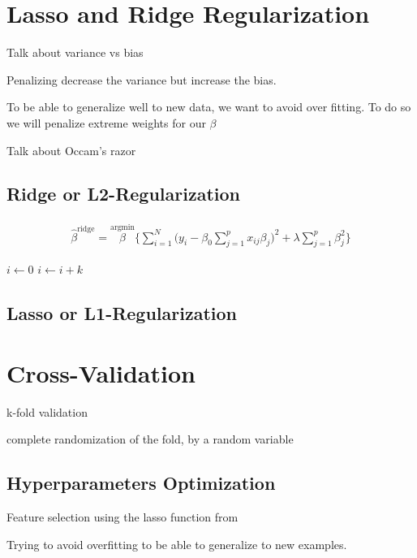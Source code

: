 \documentclass[conference]{IEEEtran}
\begin{document}
\section{Lasso and Ridge Regularization}

Talk about variance vs bias

Penalizing decrease the variance but increase the bias.

To be able to generalize well to new data, we want to avoid over fitting. To do
so we will penalize extreme weights for our $\beta$

Talk about Occam's razor

\subsection{Ridge or L2-Regularization}

\begin{eqnarray}
  \hat{\beta}^{\text{ridge}} = \stackrel{\text{argmin}}{\beta}
\Bigg\{ \sum_{i=1}^N \bigg(y_i - \beta_0 \sum_{j=1}^p x_{ij} \beta_j \bigg)^2 +
\lambda \sum_{j=1}^p \beta_j^2 \Bigg\}
\end{eqnarray}
\cite{hastie2005elements}

\begin{algorithmic}
    \State $i\gets 0$
\Else
        \State $i\gets i+k$
    \EndIf
\EndIf
\end{algorithmic}

\subsection{Lasso or L1-Regularization}

\cite{scikit-learn}
\cite{hastie2005elements}

\section{Cross-Validation}

k-fold validation

complete randomization of the fold, by a random variable

\subsection{Hyperparameters Optimization}

Feature selection using the lasso function from \cite{scikit-learn}

Trying to avoid overfitting to be able to generalize to new examples.
\end{document}
